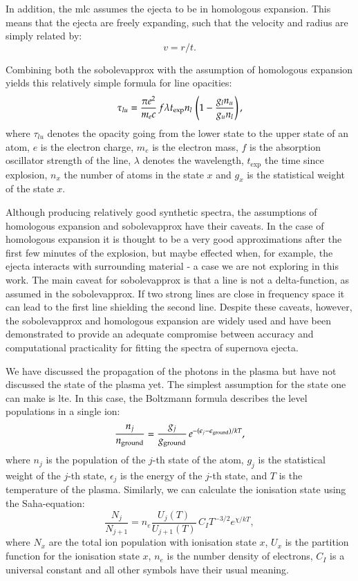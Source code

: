 In addition, the \gls{mlc} assumes the ejecta to be in homologous expansion. This means that the ejecta are freely expanding, such that the velocity and radius are simply related by:
\[
	v=  r / t.
\]

Combining both the \gls{sobolevapprox} with the assumption of homologous expansion yields this relatively simple formula for line opacities:
\begin{equation}
\label{eq:sobolevapprox}
\tau_{lu} = \frac{\pi e^2}{m_e c}\, f \lambda t_{\rm exp} n_l\, \left(1 - \frac{g_l n_u}{g_u n_l}\right), 
\end{equation}
where $\tau_{lu}$ denotes the opacity going from the lower state to the upper state of an atom, $e$ is the electron charge, $m_e$ is the electron mass, $f$ is the absorption oscillator strength of the line, $\lambda$ denotes the wavelength, $t_\textrm{exp}$ the time since explosion, $n_x$ the number of atoms in the state $x$ and $g_x$ is the statistical weight of the state $x$.

Although producing relatively good synthetic spectra, the assumptions of homologous expansion and \gls{sobolevapprox} have their caveats. In the case of homologous expansion it is thought to be a very good approximations after the first few minutes of the explosion, but maybe effected when, for example, the ejecta interacts with surrounding material - a case we are not exploring in this work. The main caveat for \gls{sobolevapprox} is that a line is not a delta-function, as assumed in the \gls{sobolevapprox}. If two strong lines are close in frequency space it can lead to the first line shielding the second line. Despite these caveats, however, the \gls{sobolevapprox} and homologous expansion are widely used and have been demonstrated to provide an adequate compromise between accuracy and computational practicality for fitting the spectra of supernova ejecta.

We have discussed the propagation of the photons in the plasma but have not discussed the state of the plasma yet. The simplest assumption for the state one can make is \gls{lte}. In this case, the Boltzmann formula describes the level populations in a single ion:
\[
\frac{n_j}{n_{\rm ground}} = \frac{g_j}{g_{\rm ground}}\,e^{-(\epsilon_j - \epsilon_{\rm ground})/kT},
\]
where $n_j$ is the population of the $j$-th state of the atom, $g_j$ is the statistical weight of the $j$-th state, $\epsilon_j$ is the energy of the $j$-th state, and $T$ is the temperature of the plasma.
Similarly, we can calculate the ionisation state using the Saha-equation:
\[
	\frac{N_j}{N_{j+1}} = n_e \frac{U_j(T)}{U_{j+1}(T)}\,C_I T^{-3/2} e^{\chi/kT},
\]
where $N_x$ are the total ion population with ionisation state $x$, $U_x$ is the partition function for the ionisation state $x$, $n_e$ is the number density of electrons, $C_I$ is a universal constant and all other symbols have their usual meaning. 


